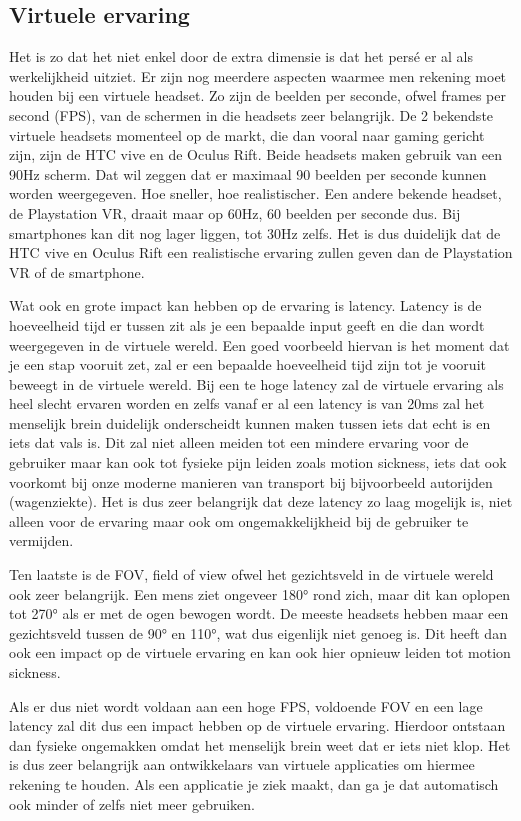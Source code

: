 \subsection{Virtuele ervaring}
Het is zo dat het niet enkel door de extra dimensie is dat het persé er al als werkelijkheid uitziet. Er zijn nog meerdere aspecten waarmee men rekening moet houden bij een virtuele headset. Zo zijn de beelden per seconde, ofwel frames per second (FPS), van de schermen in die headsets zeer belangrijk. De 2 bekendste virtuele headsets momenteel op de markt, die dan vooral naar gaming gericht zijn, zijn de HTC vive en de Oculus Rift. Beide headsets maken gebruik van een 90Hz scherm. Dat wil zeggen dat er maximaal 90 beelden per seconde kunnen worden weergegeven. Hoe sneller, hoe realistischer. Een andere bekende headset, de Playstation VR, draait maar op 60Hz, 60 beelden per seconde dus. Bij smartphones kan dit nog lager liggen, tot 30Hz zelfs. Het is dus duidelijk dat de HTC vive en Oculus Rift een realistische ervaring zullen geven dan de Playstation VR of de smartphone.

Wat ook en grote impact kan hebben op de ervaring is latency. Latency is de hoeveelheid tijd er tussen zit als je een bepaalde input geeft en die dan wordt weergegeven in de virtuele wereld. Een goed voorbeeld hiervan is het moment dat je een stap vooruit zet, zal er een bepaalde hoeveelheid tijd zijn tot je vooruit beweegt in de virtuele wereld. Bij een te hoge latency zal de virtuele ervaring als heel slecht ervaren worden en zelfs vanaf er al een latency is van 20ms zal het menselijk brein duidelijk onderscheidt kunnen maken tussen iets dat echt is en iets dat vals is. Dit zal niet alleen meiden tot een mindere ervaring voor de gebruiker maar kan ook tot fysieke pijn leiden zoals motion sickness, iets dat ook voorkomt bij onze moderne manieren van transport bij bijvoorbeeld autorijden (wagenziekte). Het is dus zeer belangrijk dat deze latency zo laag mogelijk is, niet alleen voor de ervaring maar ook om ongemakkelijkheid bij de gebruiker te vermijden.

Ten laatste is de FOV, field of view ofwel het gezichtsveld in de virtuele wereld ook zeer belangrijk. Een mens ziet ongeveer 180° rond zich, maar dit kan oplopen tot 270° als er met de ogen bewogen wordt. De meeste headsets hebben maar een gezichtsveld tussen de 90° en 110°, wat dus eigenlijk niet genoeg is. Dit heeft dan ook een impact op de virtuele ervaring en kan ook hier opnieuw leiden tot motion sickness.

Als er dus niet wordt voldaan aan een hoge FPS, voldoende FOV en een lage latency zal dit dus een impact hebben op de virtuele ervaring. Hierdoor ontstaan dan fysieke ongemakken omdat het menselijk brein weet dat er iets niet klop. Het is dus zeer belangrijk aan ontwikkelaars van virtuele applicaties om hiermee rekening te houden. Als een applicatie je ziek maakt, dan ga je dat automatisch ook minder of zelfs niet meer gebruiken.

